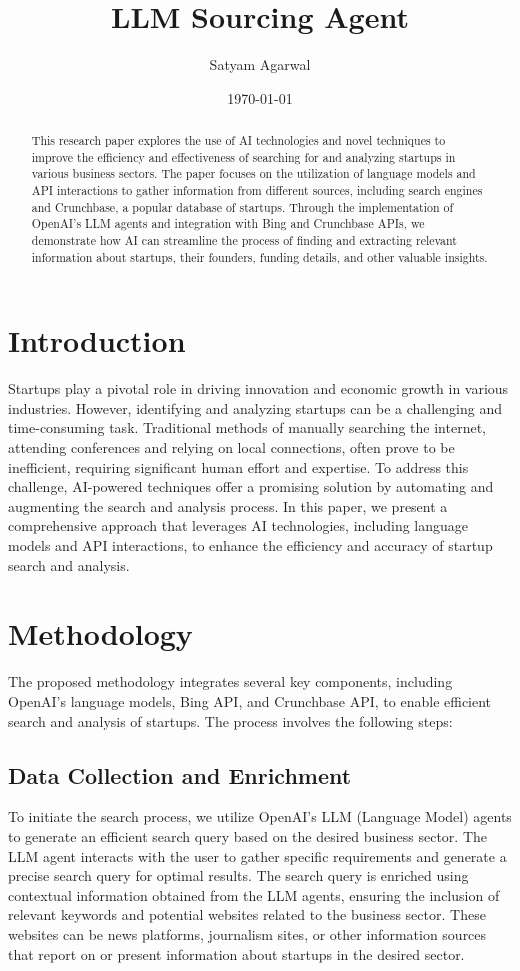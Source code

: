 \documentclass[a4paper,11pt]{article}
\title{LLM Sourcing Agent}
\author{Satyam Agarwal}
\date{\today}
\begin{document}
\maketitle

\begin{abstract}
This research paper explores the use of AI technologies and novel techniques to improve the efficiency and effectiveness of searching for and analyzing startups in various business sectors. The paper focuses on the utilization of language models and API interactions to gather information from different sources, including search engines and Crunchbase, a popular database of startups. Through the implementation of OpenAI's LLM agents and integration with Bing and Crunchbase APIs, we demonstrate how AI can streamline the process of finding and extracting relevant information about startups, their founders, funding details, and other valuable insights. 
\end{abstract}

\section{Introduction}
Startups play a pivotal role in driving innovation and economic growth in various industries. However, identifying and analyzing startups can be a challenging and time-consuming task. Traditional methods of manually searching the internet, attending conferences and relying on local connections, often prove to be inefficient, requiring significant human effort and expertise. To address this challenge, AI-powered techniques offer a promising solution by automating and augmenting the search and analysis process. In this paper, we present a comprehensive approach that leverages AI technologies, including language models and API interactions, to enhance the efficiency and accuracy of startup search and analysis.

\section{Methodology}
The proposed methodology integrates several key components, including OpenAI's language models, Bing API, and Crunchbase API, to enable efficient search and analysis of startups. The process involves the following steps:

\subsection{Data Collection and Enrichment}
To initiate the search process, we utilize OpenAI's LLM (Language Model) agents to generate an efficient search query based on the desired business sector. The LLM agent interacts with the user to gather specific requirements and generate a precise search query for optimal results. The search query is enriched using contextual information obtained from the LLM agents, ensuring the inclusion of relevant keywords and potential websites related to the business sector. These websites can be news platforms, journalism sites, or other information sources that report on or present information about startups in the desired sector.
\end{document}
